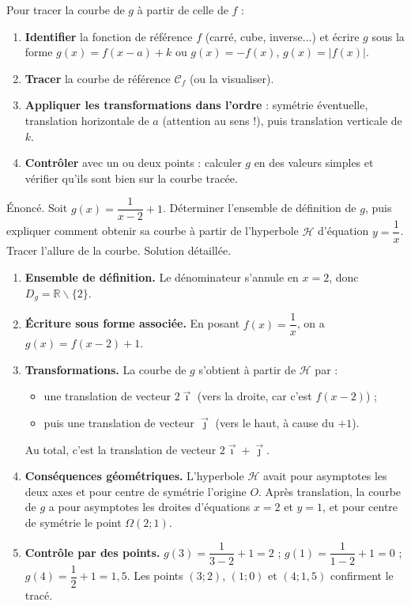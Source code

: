 \documentclass[11pt]{article}
\def\setminus{\mathbin{\backslash}}\let\smallsetminus\setminus
\begin{document}
\begin{methode}
Pour tracer la courbe de $g$ à partir de celle de $f$ :
\begin{enumerate}
\item \textbf{Identifier} la fonction de référence $f$ (carré, cube, inverse...) et écrire $g$ sous la forme $g(x) = f(x - a) + k$ ou $g(x) = -f(x)$, $g(x) = |f(x)|$.
\item \textbf{Tracer} la courbe de référence $\mathcal{C}_f$ (ou la visualiser).
\item \textbf{Appliquer les transformations dans l'ordre} : symétrie éventuelle, translation horizontale de $a$ (attention au sens !), puis translation verticale de $k$.
\item \textbf{Contrôler} avec un ou deux points : calculer $g$ en des valeurs simples et vérifier qu'ils sont bien sur la courbe tracée.
\end{enumerate}
\end{methode}

\begin{exoresolu}
Énoncé. Soit $g(x) = \dfrac{1}{x - 2} + 1$. Déterminer l'ensemble de définition de $g$, puis expliquer comment obtenir sa courbe à partir de l'hyperbole $\mathcal{H}$ d'équation $y = \dfrac{1}{x}$. Tracer l'allure de la courbe.
\tcblower
Solution détaillée.
\begin{enumerate}
\item \textbf{Ensemble de définition.} Le dénominateur s'annule en $x = 2$, donc $D_g = \mathbb{R} \setminus \{2\}$.
\item \textbf{Écriture sous forme associée.} En posant $f(x) = \dfrac{1}{x}$, on a $g(x) = f(x - 2) + 1$.
\item \textbf{Transformations.} La courbe de $g$ s'obtient à partir de $\mathcal{H}$ par :
\begin{itemize}
\item une translation de vecteur $2\vec{\imath}$ (vers la droite, car c'est $f(x - 2)$) ;
\item puis une translation de vecteur $\vec{\jmath}$ (vers le haut, à cause du $+1$).
\end{itemize}
Au total, c'est la translation de vecteur $2\vec{\imath} + \vec{\jmath}$.
\item \textbf{Conséquences géométriques.} L'hyperbole $\mathcal{H}$ avait pour asymptotes les deux axes et pour centre de symétrie l'origine $O$. Après translation, la courbe de $g$ a pour asymptotes les droites d'équations $x = 2$ et $y = 1$, et pour centre de symétrie le point $\Omega(2 ; 1)$.
\item \textbf{Contrôle par des points.} $g(3) = \dfrac{1}{3-2} + 1 = 2$ ; $g(1) = \dfrac{1}{1-2} + 1 = 0$ ; $g(4) = \dfrac{1}{2} + 1 = 1{,}5$. Les points $(3 ; 2)$, $(1 ; 0)$ et $(4 ; 1{,}5)$ confirment le tracé.
\end{enumerate}
\end{exoresolu}
\end{document}
